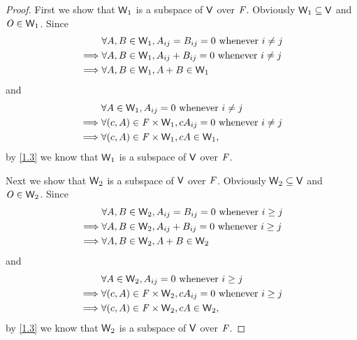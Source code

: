 \begin{proof}
  First we show that \(\mathsf{W}_1\) is a subspace of \(\mathsf{V}\) over \(\mathit{F}\).
  Obviously \(\mathsf{W}_1 \subseteq \mathsf{V}\) and \(\mathit{O} \in \mathsf{W}_1\).
  Since
  \begin{align*}
             & \forall A, B \in \mathsf{W}_1, A_{i j} = B_{i j} = 0 \text{ whenever } i \neq j \\
    \implies & \forall A, B \in \mathsf{W}_1, A_{i j} + B_{i j} = 0 \text{ whenever } i \neq j \\
    \implies & \forall A, B \in \mathsf{W}_1, A + B \in \mathsf{W}_1
  \end{align*}
  and
  \begin{align*}
             & \forall A \in \mathsf{W}_1, A_{i j} = 0 \text{ whenever } i \neq j                 \\
    \implies & \forall (c, A) \in \mathit{F} \times \mathsf{W}_1, cA_{i j} = 0 \text{ whenever } i \neq j \\
    \implies & \forall (c, A) \in \mathit{F} \times \mathsf{W}_1, cA \in \mathsf{W}_1,
  \end{align*}
  by \cref{1.3} we know that \(\mathsf{W}_1\) is a subspace of \(\mathsf{V}\) over \(\mathit{F}\).

  Next we show that \(\mathsf{W}_2\) is a subspace of \(\mathsf{V}\) over \(\mathit{F}\).
  Obviously \(\mathsf{W}_2 \subseteq \mathsf{V}\) and \(\mathit{O} \in \mathsf{W}_2\).
  Since
  \begin{align*}
             & \forall A, B \in \mathsf{W}_2, A_{i j} = B_{i j} = 0 \text{ whenever } i \geq j \\
    \implies & \forall A, B \in \mathsf{W}_2, A_{i j} + B_{i j} = 0 \text{ whenever } i \geq j \\
    \implies & \forall A, B \in \mathsf{W}_2, A + B \in \mathsf{W}_2
  \end{align*}
  and
  \begin{align*}
             & \forall A \in \mathsf{W}_2, A_{i j} = 0 \text{ whenever } i \geq j                 \\
    \implies & \forall (c, A) \in \mathit{F} \times \mathsf{W}_2, cA_{i j} = 0 \text{ whenever } i \geq j \\
    \implies & \forall (c, A) \in \mathit{F} \times \mathsf{W}_2, cA \in \mathsf{W}_2,
  \end{align*}
  by \cref{1.3} we know that \(\mathsf{W}_2\) is a subspace of \(\mathsf{V}\) over \(\mathit{F}\).


\end{proof}
